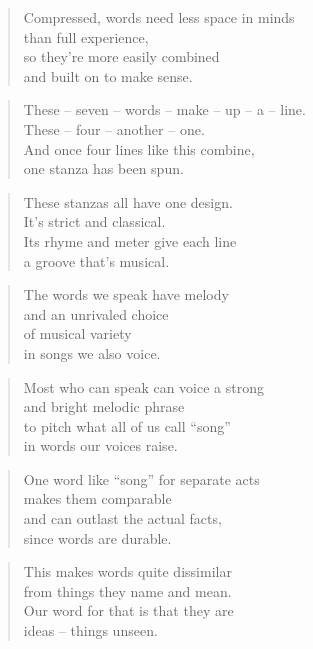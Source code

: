 \documentclass[10pt,a4paper]{article}
\begin{document}
\begin{multicols}{2}
\begin{verse}
Compressed, words need less space in minds\\
than full experience,\\
so they’re more easily combined\\
and built on to make sense.
\end{verse}

\begin{verse}
These – seven – words – make – up – a – line.\\
These – four – another – one.\\
And once four lines like this combine,\\
one stanza has been spun.
\end{verse}

\begin{verse}
These stanzas all have one design.\\
It’s strict and classical.\\
Its rhyme and meter give each line\\
a groove that’s musical.
\end{verse}

\begin{verse}
The words we speak have melody\\
and an unrivaled choice\\
of musical variety\\
in songs we also voice.
\end{verse}

\begin{verse}
Most who can speak can voice a strong\\
and bright melodic phrase\\
to pitch what all of us call “song”\\
in words our voices raise.
\end{verse}

\begin{verse}
One word like “song” for separate acts\\
makes them comparable\\
and can outlast the actual facts,\\
since words are durable.
\end{verse}

\begin{verse}
This makes words quite dissimilar\\
from things they name and mean.\\
Our word for that is that they are\\
ideas – things unseen.
\end{verse}


\end{multicols}
\end{document}
